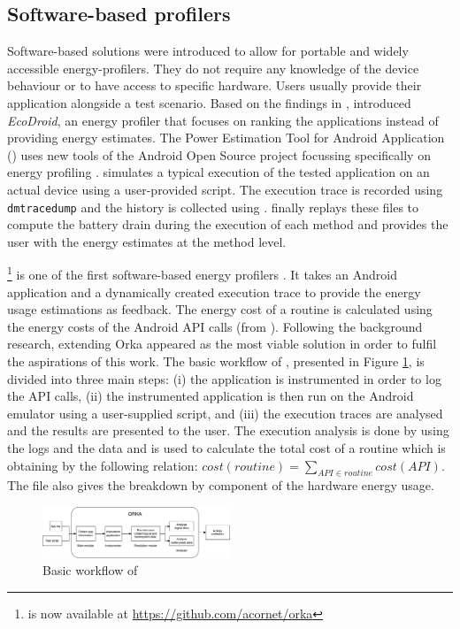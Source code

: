 \subsection{Software-based profilers}

Software-based solutions were introduced to allow for portable and 
widely accessible energy-profilers. They do not require any knowledge of 
the device behaviour or to have access to specific hardware. Users 
usually provide their application alongside a test scenario. Based on 
the findings in \cite{linares2014mining}, \cite{jabbarvand2015ecodroid} 
introduced \textit{EcoDroid}, an energy profiler that focuses on ranking 
the applications instead of providing energy estimates. The Power 
Estimation Tool for Android Application (\petra{}) uses new tools of the 
Android Open Source project focussing specifically on energy profiling 
\cite{petra}. \petra{} simulates a typical execution of the tested 
application on an actual device using a user-provided script. The 
execution trace is recorded using \texttt{dmtracedump} and the 
\batterystats{} history is collected using \dumpsys{}. \petra{} finally 
replays these files to compute the battery drain during the execution of 
each method and provides the user with the energy estimates at the 
method level.

\Orka{} \footnote{\Orka{} is now available at 
\url{https://github.com/acornet/orka}} is one of the first 
software-based energy profilers \cite{westfield2016orka}. It takes an 
Android application and a dynamically created execution trace to provide 
the energy usage estimations as feedback. The energy cost of a routine 
is calculated using the energy costs of the Android API calls (from 
\cite{linares2014mining}). Following the background research, extending 
Orka appeared as the most viable solution in order to fulfil the 
aspirations of this work. The basic workflow of \Orka{}, presented in 
Figure \ref{fig:orkaworkflow}, is divided into three main steps: (i) the 
application is instrumented in order to log the API calls, (ii) the 
instrumented application is then run on the Android emulator using a 
user-supplied \monkeyrunner{} script, and (iii) the execution traces are 
analysed and the results are presented to the user. The execution 
analysis is done by using the logs and the \batterystats{} data and is 
used to calculate the total cost of a routine which is obtaining by the 
following relation: $cost(routine) = \sum_{API \in routine} cost(API)$. 
The \batterystats{} file also gives the breakdown by component of the 
hardware energy usage.

\begin{figure}
\centering
\includegraphics[width=0.5\textwidth]{figures/orkaworkflow.pdf}
\caption{Basic workflow of \Orka{}}
\label{fig:orkaworkflow}
\vspace {-0.32in}
\end{figure}
